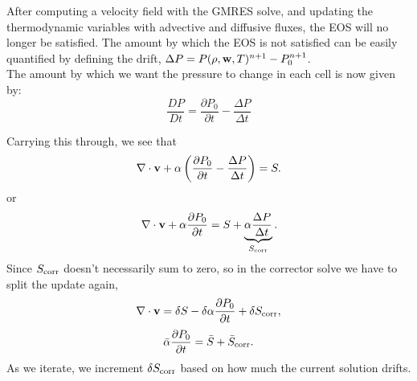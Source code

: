 \documentclass[final]{siamltex}
\def\vb {{\bf v}}
\def\wb {{\bf w}}
\begin{document}
After computing a velocity field with the GMRES solve, and updating the thermodynamic
variables with advective and diffusive fluxes, the EOS will no longer be satisfied.
The amount by which the EOS is not satisfied can be easily quantified by defining
the drift, $\Delta P = P(\rho,\wb,T)^{n+1} - P_0^{n+1}$.\\

The amount by which we want the pressure to change in each cell is now given by:
\begin{equation}
\frac{DP}{Dt} = \frac{\partial P_0}{\partial t} - \frac{\Delta P}{\Delta t}
\end{equation}

Carrying this through, we see that
\begin{equation}
\nabla\cdot\vb + \alpha\left(\frac{\partial P_0}{\partial t} - \frac{\Delta P}{\Delta t}\right) = S.
\end{equation}
or
\begin{equation}
\nabla\cdot\vb + \alpha\frac{\partial P_0}{\partial t} = S + \underbrace{\alpha\frac{\Delta P}{\Delta t}}_{S_{\rm corr}}.
\end{equation}
Since $S_{\rm corr}$ doesn't necessarily sum to zero, so in the 
corrector solve we have to split the update again,
\begin{equation}
\nabla\cdot\vb = \delta S - \delta\alpha\frac{\partial P_0}{\partial t} + \delta S_{\rm corr},
\end{equation}
\begin{equation}
\bar{\alpha}\frac{\partial P_0}{\partial t} = \bar{S} + \bar{S}_{\rm corr}.
\end{equation}
As we iterate, we increment $\delta S_{\rm corr}$ based on how much the current solution
drifts.
\end{document}
